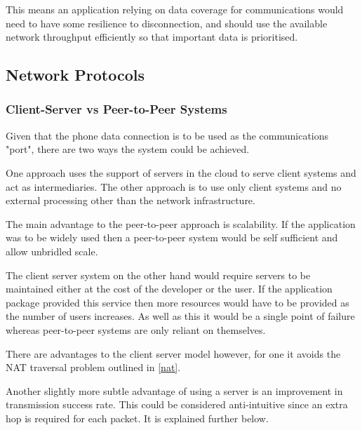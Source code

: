 This means an application relying on data coverage for communications would need to have some resilience to disconnection, and should use the available network throughput efficiently so that important data is prioritised.

\subsection{Network Protocols}

\subsubsection{Client-Server vs Peer-to-Peer Systems}
Given that the phone data connection is to be used as the communications "port", there are two ways the system could be achieved.

One approach uses the support of servers in the cloud to serve client systems and act as intermediaries. The other approach is to use only client systems and no external processing other than the network infrastructure.

The main advantage to the peer-to-peer approach is scalability. If the application was to be widely used then a peer-to-peer system would be self sufficient and allow unbridled scale.

The client server system on the other hand would require servers to be maintained either at the cost of the developer or the user. If the application package provided this service then more resources would have to be provided as the number of users increases. As well as this it would be a single point of failure whereas peer-to-peer systems are only reliant on themselves.

There are advantages to the client server model however, for one it avoids the NAT traversal problem outlined in \ref{nat}.

Another slightly more subtle advantage of using a server is an improvement in transmission success rate. This could be considered anti-intuitive since an extra hop is required for each packet. It is explained further below.

